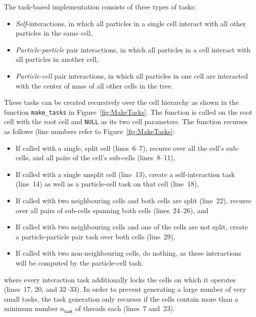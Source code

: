 \documentclass[preprint]{elsarticle}
\newcommand{\fig}[1]
    {Figure~\ref{fig:#1}}
\begin{document}
The task-based implementation consists of three
types of tasks:
\begin{itemize}
    \item {\em Self}-interactions, in which all particles
        in a single cell interact with all other particles in the
        same cell,
    \item {\em Particle-particle} pair interactions, in which
        all particles in a cell interact with all
        particles in another cell,
    \item {\em Particle-cell} pair interactions, in which
        all particles in one cell are interacted with the
        center of mass of all other cells in the tree.
\end{itemize}

These tasks can be created recursively over the cell hierarchy
as shown in the function {\tt make\_tasks} in \fig{MakeTasks}.
The function is called on the root cell with the root cell
and {\tt NULL} as its two cell parameters.
The function recurses as follows (line numbers refer to \fig{MakeTasks}:
\begin{itemize}
    \item If called with a single, split cell (lines~6--7),
        recurse over all the cell's sub-cells, and all
        pairs of the cell's sub-cells (lines~8--11),
    \item If called with a single unsplit cell (line~13),
        create a self-interaction task (line~14) as well as a particle-cell
        task on that cell (line~18),
    \item If called with two neighbouring cells and both cells
        are split (line~22),
        recurse over all pairs of sub-cells spanning
        both cells (lines~24--26), and
    \item If called with two neighbouring cells
        and one of the cells are not split, create
        a particle-particle pair task over both cells (line~29),
    \item If called with two non-neighbouring cells,
        do nothing, as these interactions
        will be computed by the particle-cell task.
\end{itemize}
\noindent where every interaction task additionally locks
the cells on which it operates (lines~17, 20, and 32--33).
In order to prevent generating
a large number of very small tasks, the task generation only recurses
if the cells contain more than a minimum number $n_\mathsf{task}$
of threads each (lines~7 and~23).
\end{document}
